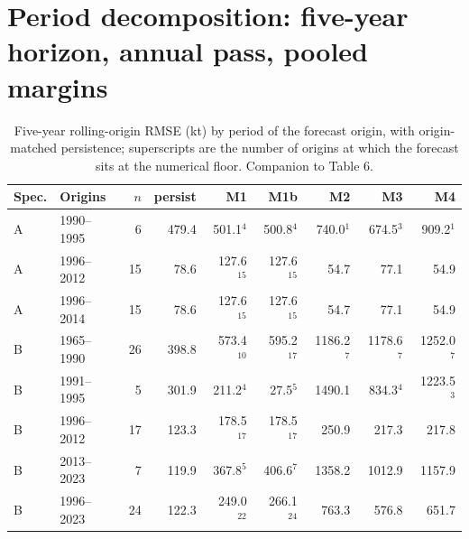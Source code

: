 \documentclass[preprint,11pt,authoryear]{elsarticle}
\theoremstyle{remark}
\begin{document}
\FloatBarrier
\section{Period decomposition: five-year horizon, annual pass, pooled margins}\label{si:periods}

\begin{table}[!htb]
\centering\footnotesize\setlength{\tabcolsep}{3.5pt}
\caption{Five-year rolling-origin RMSE (kt) by period of the forecast origin, with origin-matched persistence; superscripts are the number of origins at which the forecast sits at the numerical floor. Companion to Table 6.}
\label{tab:si_h5}
\begin{tabular}{@{}llrrrrrrr@{}}
\toprule
Spec. & Origins & $n$ & persist & M1 & M1b & M2 & M3 & M4 \\
\midrule
A & 1990--1995 & 6 & 479.4 & 501.1$^{4}$ & 500.8$^{4}$ & 740.0$^{1}$ & 674.5$^{3}$ & 909.2$^{1}$ \\
A & 1996--2012 & 15 & 78.6 & 127.6$^{15}$ & 127.6$^{15}$ & 54.7 & 77.1 & 54.9 \\
A & 1996--2014 & 15 & 78.6 & 127.6$^{15}$ & 127.6$^{15}$ & 54.7 & 77.1 & 54.9 \\
\midrule
B & 1965--1990 & 26 & 398.8 & 573.4$^{10}$ & 595.2$^{17}$ & 1186.2$^{7}$ & 1178.6$^{7}$ & 1252.0$^{7}$ \\
B & 1991--1995 & 5 & 301.9 & 211.2$^{4}$ & 27.5$^{5}$ & 1490.1 & 834.3$^{4}$ & 1223.5$^{3}$ \\
B & 1996--2012 & 17 & 123.3 & 178.5$^{17}$ & 178.5$^{17}$ & 250.9 & 217.3 & 217.8 \\
B & 2013--2023 & 7 & 119.9 & 367.8$^{5}$ & 406.6$^{7}$ & 1358.2 & 1012.9 & 1157.9 \\
B & 1996--2023 & 24 & 122.3 & 249.0$^{22}$ & 266.1$^{24}$ & 763.3 & 576.8 & 651.7 \\
\bottomrule
\end{tabular}
\end{table}
\end{document}
